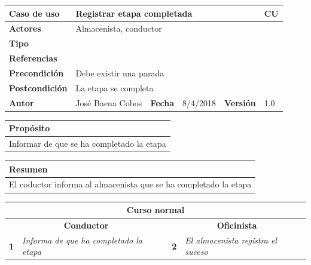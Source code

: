 \documentclass[12pt,spanish]{article}
\begin{document}
\begin{table}[H]
	\centering
	\begin{tabular}{|m{3cm}|m{4cm}|m{2cm}|m{2cm}|m{2cm}|m{1cm}|}
		\hline
		\textbf{Caso de uso} &  \multicolumn{4}{m{11cm}|}{Registrar etapa completada} \vline &  \cellcolor{gray!40}CU\arabic{contadorCU}  \stepcounter{contadorCU} \\
		\hline
		\textbf{Actores} & \multicolumn{5}{m{11cm}|}{Almacenista, conductor} \\
		\hline
		\textbf{Tipo} & \multicolumn{5}{m{11cm}|}{} \\
		\hline
		\textbf{Referencias} &\multicolumn{5}{m{11cm}|}{} \\
		\hline
		\textbf{Precondición} & \multicolumn{5}{m{11cm}|}{Debe existir una parada} \\
		\hline
		\textbf{Postcondición} & \multicolumn{5}{m{11cm}|}{La etapa se completa} \\
		\hline
		\textbf{Autor} & José Baena Cobos & \textbf{Fecha} & 8/4/2018 & \textbf{Versión} & 1.0 \\
		\hline
	\end{tabular}
	
	\vspace{1cm}
	
	\begin{tabular}{|m{16.2cm}|}
		\hline
		\textbf{Propósito} \\
		\hline
		Informar de que se ha completado la etapa\\
		\hline
	\end{tabular}
	
	\vspace{1cm}
	
	\begin{tabular}{|m{16.2cm}|}
		\hline
		\textbf{Resumen} \\
		\hline
		El coductor informa al almacenista que se ha completado la etapa\\
		\hline
	\end{tabular}
	
	\vspace{1cm}
	
	\begin{tabular}{|m{5pt}|m{7.33cm}|m{5pt}|m{7.33cm}|}
		\hline
		\multicolumn{4}{|c|}{\textbf{Curso normal}} \\
		\hline
		\multicolumn{2}{|c}{\textbf{Conductor}} & \multicolumn{2}{|c|}{\textbf{Oficinista}} \\
		\hline
		\textbf{1} & \textit{Informa de que ha completado la etapa} & \textbf{2} & \textit{El almacenista registra el suceso} \\
		\hline
	

\end{tabular}
\end{table}
\end{document}
